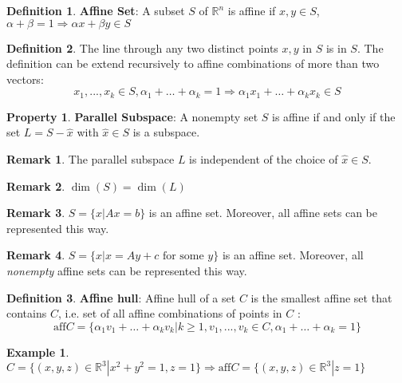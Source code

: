 \documentclass[10pt]{article}
\def\R{\mathbb{R}}
\def\a{\alpha}
\def\b{\beta}
\def\imp{\Rightarrow}
\theoremstyle{definition}
\newtheorem{defn}{Definition}[section]
\newtheorem{example}{Example}[section]
\newtheorem{pty}{Property}[section]
\newtheorem{remark}{Remark}[section]
\begin{document}
\begin{defn}
	\textbf{Affine Set}: A subset $S$ of $\R^n$ is affine if $x, y \in S$, $\a + \b = 1 \imp \a x+ \b y \in S$
\end{defn}

\begin{defn}
	The line through any two distinct points $x, y$ in $S$ is in $S$.
	The definition can be extend recursively to affine combinations of more than two vectors:
	\begin{equation*}
		x_1, ..., x_k \in S, \a_1 + \dots + \a_k = 1 \imp \a_1 x_1 + \dots + \a_k x_k \in S
	\end{equation*}
\end{defn}

\begin{pty}
	\textbf{Parallel Subspace}:
	A nonempty set $S$ is affine if and only if the set $L = S - \hat{x}$ with $\hat{x} \in S$ is a subspace.
\end{pty}

\begin{remark}
	The parallel subspace $L$ is independent of the choice of $\hat{x} \in S$.
\end{remark}

\begin{remark}
	$\dim(S) = \dim(L)$
\end{remark}

\begin{remark}
	$S = \{x | Ax = b\}$ is an affine set. Moreover, all affine sets can be represented this way.
\end{remark}

\begin{remark}
	$S = \{x | x = Ay + c \text{ for some } y\}$ is an affine set.
	Moreover, all \textit{nonempty} affine sets can be represented this way.
\end{remark}

\begin{defn}
	\textbf{Affine hull}: Affine hull of a set $C$ is the smallest affine set that contains $C$,
	i.e. set of all affine combinations of points in $C$ :
	\begin{equation*}
		\text{aff} C = \{\a_1 v_1 + \dots + \a_k v_k| k \ge 1, v_1, ..., v_k \in C, \a_1 + \dots + \a_k = 1\}
	\end{equation*}
\end{defn}

\begin{example}
	$C = \{(x, y, z) \in \R^3 | x^2 + y^2 =1, z= 1\} \imp \text{aff} C = \{(x, y, z) \in \R^3 | z= 1\}$
\end{example}
\end{document}
